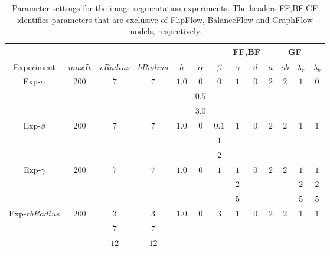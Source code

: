 \begin{table}
\centering
\begin{tabular}{|c|c|c|c|c|c|c|c|c|c|c|c|c|}
\cline{8-13}
\multicolumn{7}{c|}{} & \multicolumn{2}{|c|}{FF,BF} & \multicolumn{4}{|c|}{GF}\\
\hline
Experiment & $maxIt$ & $vRadius$ & $bRadius$ & $h$ & $\alpha$ & $\beta$  & $\gamma$ & $d$ & $a$ & $ob$ & $\lambda_r$ & $\lambda_b$ \\
\hline
\multirow{3}{*}{Exp-$\alpha$} & \multirow{3}{*}{$200$} & \multirow{3}{*}{$7$} & \multirow{3}{*}{$7$} & \multirow{3}{*}{$1.0$} & $0$ & \multirow{3}{*}{$0$} & \multirow{3}{*}{$1$} & \multirow{3}{*}{$0$} & \multirow{3}{*}{$2$} & \multirow{3}{*}{$2$} & \multirow{3}{*}{$1$} & \multirow{3}{*}{$0$} \\
&  & & & & $0.5$ & & & & & & &\\
&  & & & & $3.0$ & & & & & & &\\
\hline
\multirow{3}{*}{Exp-$\beta$} & \multirow{3}{*}{$200$} & \multirow{3}{*}{$7$} & \multirow{3}{*}{$7$} & \multirow{3}{*}{$1.0$} & \multirow{3}{*}{$0$} & $0.1$ & \multirow{3}{*}{$1$} & \multirow{3}{*}{$0$} & \multirow{3}{*}{$2$} & \multirow{3}{*}{$2$} & \multirow{3}{*}{$1$} & \multirow{3}{*}{$1$} \\
&  & & & & & $1$ & & & & & &\\
&  & & & & & $2$ & & & & & &\\
\hline
\multirow{3}{*}{Exp-$\gamma$} & \multirow{3}{*}{$200$} & \multirow{3}{*}{$7$} & \multirow{3}{*}{$7$} & \multirow{3}{*}{$1.0$} & \multirow{3}{*}{$0$} & \multirow{3}{*}{$1$} & $1$ & \multirow{3}{*}{$0$} & \multirow{3}{*}{$2$} & \multirow{3}{*}{$2$} & $1$ & $1$ \\
&  & & & & & & $2$ & & & & $2$ & $2$\\
&  & & & & & & $5$ & & & & $5$ & $5$\\
\hline
\multirow{3}{*}{Exp-$rbRadius$} & \multirow{3}{*}{$200$} & $3$ & $3$ & \multirow{3}{*}{$1.0$} &  \multirow{3}{*}{$0$} & \multirow{3}{*}{$3$} & \multirow{3}{*}{$1$} & \multirow{3}{*}{$0$} & \multirow{3}{*}{$2$} & \multirow{3}{*}{$2$} & \multirow{3}{*}{$1$} & \multirow{3}{*}{$1$} \\
&  & $7$ & $7$ & & & & & & & & & \\
&  & $12$ & $12$ & & & & & & & & & \\
\hline
\end{tabular}
\caption{Parameter settings for the image segmentation experiments. The headers FF,BF,GF identifies parameters that are exclusive of FlipFlow, BalanceFlow and GraphFlow models, respectively.}
\label{tab:image-segmentation-parameters-summary}
\end{table}


